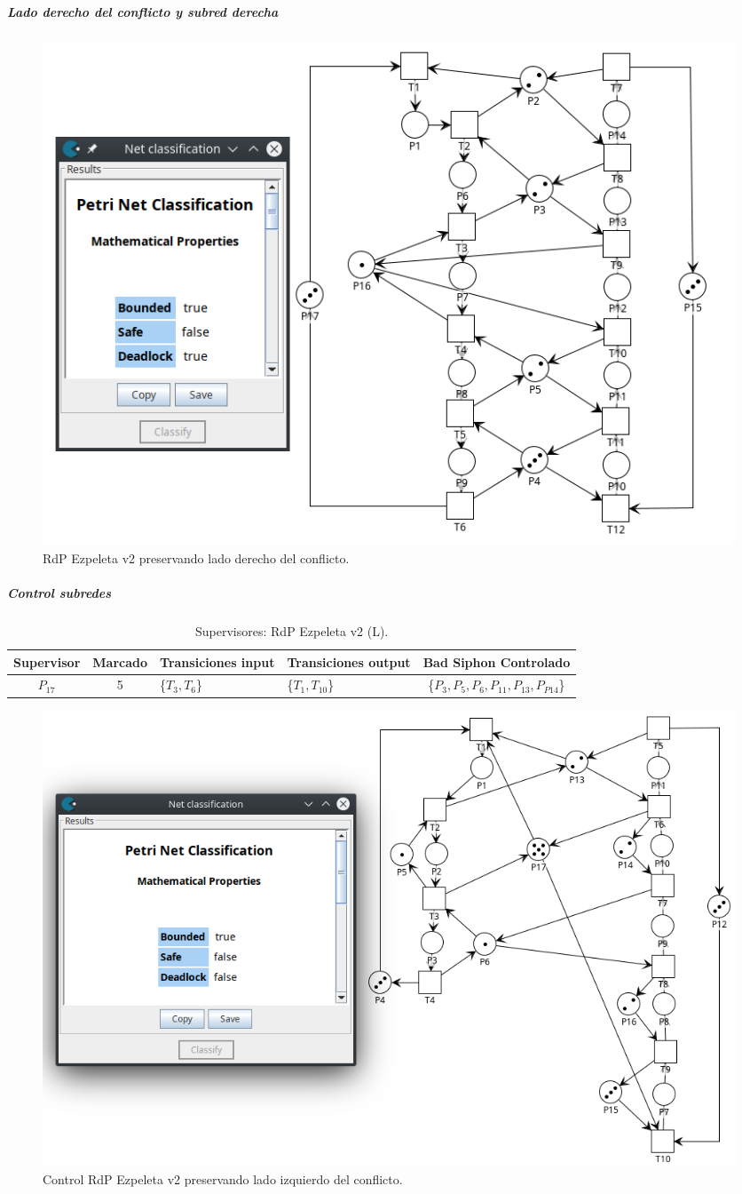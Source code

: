 \subparagraph{Lado derecho del conflicto y subred derecha}
\hfill \break
\begin{figure}[H]
	\centering
	\includegraphics[scale=0.625]{Figures/algoritmo3/ezpeletav24.png}
	\caption{RdP Ezpeleta v2 preservando lado derecho del conflicto.}
	\label{fig:conflictoder_ezpeletav2}
 \end{figure}
 
\subparagraph{Control subredes}
\hfill
\bigskip

\begin{table}[H]
    \centering
    \begin{tabular}{|c|c|P{2.2cm}|P{2.2cm}|c|}
    \hline
    \textbf{Supervisor} & \textbf{Marcado} & \textbf{Transiciones input} & \textbf{Transiciones output} & \textbf{Bad Siphon Controlado}  \\  \hline
    $P_{17}$ & 5 & \{$T_{3}, T_{6}$\} & \{$T_{1}, T_{10}$\} & \{$P_3, P_{5}, P_{6}, P_{11}, P_{13}, P_{P14}$\} \\ 
    \hline
    \end{tabular}
    \caption{Supervisores: RdP Ezpeleta v2 (L).}
    \label{tab:Ezpeletav2-SubL-v3}
\end{table}
\bigskip

\begin{figure}[H]
	\centering
	\includegraphics[scale=0.5]{Figures/algoritmo3/ezpeletav25.png}
	\caption{Control RdP Ezpeleta v2 preservando lado izquierdo del conflicto.}
	\label{fig:control_conflictoizq_ezpeletav2}
 \end{figure}
 \bigskip
 
